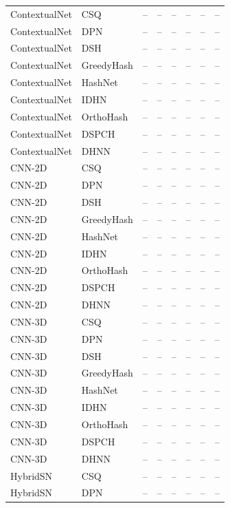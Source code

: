 \begin{longtable}{llrrrrrr}
\addlinespace
ContextualNet & CSQ & -- & -- & -- & -- & -- & -- \\
ContextualNet & DPN & -- & -- & -- & -- & -- & -- \\
ContextualNet & DSH & -- & -- & -- & -- & -- & -- \\
ContextualNet & GreedyHash & -- & -- & -- & -- & -- & -- \\
ContextualNet & HashNet & -- & -- & -- & -- & -- & -- \\
ContextualNet & IDHN & -- & -- & -- & -- & -- & -- \\
ContextualNet & OrthoHash & -- & -- & -- & -- & -- & -- \\
ContextualNet & DSPCH & -- & -- & -- & -- & -- & -- \\
ContextualNet & DHNN & -- & -- & -- & -- & -- & -- \\
\addlinespace
CNN-2D & CSQ & -- & -- & -- & -- & -- & -- \\
CNN-2D & DPN & -- & -- & -- & -- & -- & -- \\
CNN-2D & DSH & -- & -- & -- & -- & -- & -- \\
CNN-2D & GreedyHash & -- & -- & -- & -- & -- & -- \\
CNN-2D & HashNet & -- & -- & -- & -- & -- & -- \\
CNN-2D & IDHN & -- & -- & -- & -- & -- & -- \\
CNN-2D & OrthoHash & -- & -- & -- & -- & -- & -- \\
CNN-2D & DSPCH & -- & -- & -- & -- & -- & -- \\
CNN-2D & DHNN & -- & -- & -- & -- & -- & -- \\
\addlinespace
CNN-3D & CSQ & -- & -- & -- & -- & -- & -- \\
CNN-3D & DPN & -- & -- & -- & -- & -- & -- \\
CNN-3D & DSH & -- & -- & -- & -- & -- & -- \\
CNN-3D & GreedyHash & -- & -- & -- & -- & -- & -- \\
CNN-3D & HashNet & -- & -- & -- & -- & -- & -- \\
CNN-3D & IDHN & -- & -- & -- & -- & -- & -- \\
CNN-3D & OrthoHash & -- & -- & -- & -- & -- & -- \\
CNN-3D & DSPCH & -- & -- & -- & -- & -- & -- \\
CNN-3D & DHNN & -- & -- & -- & -- & -- & -- \\
\addlinespace
HybridSN & CSQ & -- & -- & -- & -- & -- & -- \\
HybridSN & DPN & -- & -- & -- & -- & -- & -- \\

\end{longtable}

